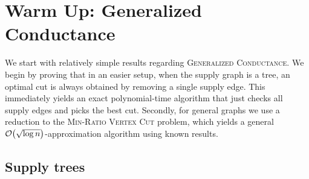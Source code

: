 ﻿\section{Warm Up: Generalized Conductance}

We start with relatively simple results regarding \textsc{Generalized Conductance}. We begin by proving that in an easier setup, when the supply graph is a tree, an optimal cut is always obtained by removing a single supply edge. This immediately yields an exact polynomial-time algorithm that just checks all supply edges and picks the best cut.
Secondly, for general graphs we use a reduction to the \textsc{Min-Ratio Vertex Cut} problem, which yields a general $\mathcal{O}\mathopen{}\left( \sqrt{\log n} \right)$-approximation algorithm using known results.

\subsection{Supply trees}

